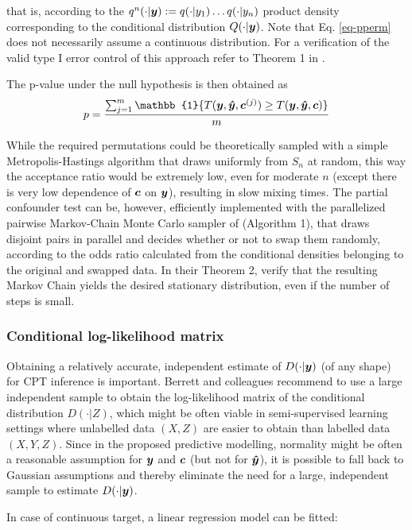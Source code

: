 \documentclass{article}
\begin{document}
that is, according to the $q^n(\cdot|\boldsymbol{y}) := q(\cdot | y_1) \dots q(\cdot|y_n)$ product density corresponding to the conditional distribution $Q(\cdot|\boldsymbol{y})$. Note that Eq. \ref{eq-pperm} does not necessarily assume a continuous distribution.
For a verification of the valid type I error control of this approach refer to Theorem 1 in \citep{berrett2020conditional}.

The p-value under the null hypothesis is then obtained as
$$ p= \frac{\sum_{j=1}^m \mathbb{1} \{T(\y, \yhat, \c^{(j)}) \geq T(\y, \yhat, \c) \}  }{m}$$

While the required permutations could be theoretically sampled with a simple Metropolis-Hastings algorithm that draws uniformly from $S_n$ at random, this way the acceptance ratio would be extremely low, even for moderate $n$ (except there is very low dependence of $\boldsymbol{c}$ on $\boldsymbol{y}$), resulting in slow mixing times. The partial confounder test can be, however, efficiently implemented with the parallelized pairwise Markov-Chain Monte Carlo sampler of \cite{berrett2020conditional} (Algorithm 1), that draws disjoint pairs in parallel and decides whether or not to swap them randomly, according to the odds ratio calculated from the conditional densities belonging to the original and swapped data. In their Theorem 2, \cite{berrett2020conditional} verify that the resulting Markov Chain yields the desired stationary distribution, even if the number of steps is small.

\subsubsection*{Conditional log-likelihood matrix}


Obtaining a relatively accurate, independent estimate of $D(\cdot|\boldsymbol{y})$ (of any shape) for CPT inference is important. Berrett and colleagues recommend to use a large independent sample to obtain the log-likelihood matrix of the conditional distribution $D(\cdot|Z)$, which might be often viable in semi-supervised learning settings where unlabelled data $(X, Z)$ are easier to obtain than labelled data $(X, Y, Z)$.
Since in the proposed predictive modelling, normality might be often a reasonable assumption for $\boldsymbol{y}$ and $\boldsymbol{c}$ (but not for $\boldsymbol{\hat{y}}$), it is possible to fall back to Gaussian assumptions and thereby eliminate the need for a large, independent sample to estimate $D(\cdot|\boldsymbol{y})$.

In case of continuous target, a linear regression model  can be fitted:
\end{document}
